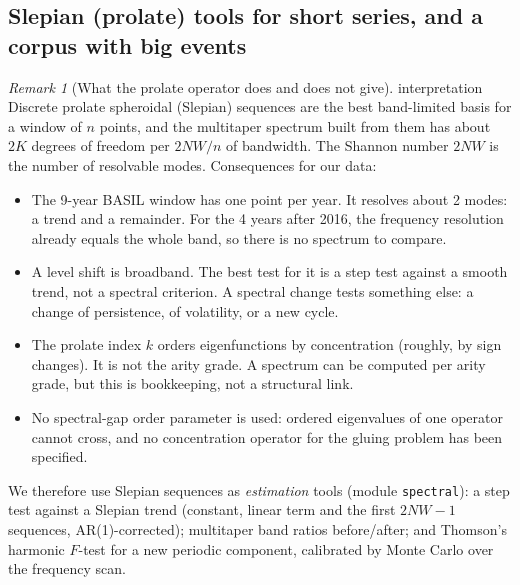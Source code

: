 \documentclass[11pt]{article}
\theoremstyle{definition}
\theoremstyle{remark}
\newtheorem{remark}[theorem]{Remark}
\newcommand{\st}[1]{\textsf{\small\color{gray}#1}}
\begin{document}
\subsection{Slepian (prolate) tools for short series, and a corpus with big events}\label{sec:slepian}
\begin{remark}[What the prolate operator does and does not give]\st{interpretation}
Discrete prolate spheroidal (Slepian) sequences \cite{slepian,thomson} are the best band-limited basis for a window of $n$ points, and the multitaper spectrum built from them has about $2K$ degrees of freedom per $2NW/n$ of bandwidth. The Shannon number $2NW$ is the number of resolvable modes. Consequences for our data:
\begin{itemize}
  \item The 9-year BASIL window has one point per year. It resolves about 2 modes: a trend and a remainder. For the 4 years after 2016, the frequency resolution already equals the whole band, so there is no spectrum to compare.
  \item A level shift is broadband. The best test for it is a step test against a smooth trend, not a spectral criterion. A spectral change tests something else: a change of persistence, of volatility, or a new cycle.
  \item The prolate index $k$ orders eigenfunctions by concentration (roughly, by sign changes). It is not the arity grade. A spectrum can be computed per arity grade, but this is bookkeeping, not a structural link.
  \item No spectral-gap order parameter is used: ordered eigenvalues of one operator cannot cross, and no concentration operator for the gluing problem has been specified.
\end{itemize}
We therefore use Slepian sequences as \emph{estimation} tools (module \texttt{spectral}): a step test against a Slepian trend (constant, linear term and the first $2NW{-}1$ sequences, AR(1)-corrected); multitaper band ratios before/after; and Thomson's harmonic $F$-test for a new periodic component, calibrated by Monte Carlo over the frequency scan.
\end{remark}
\end{document}
